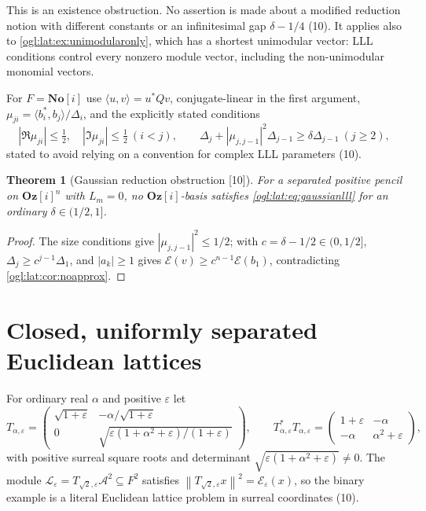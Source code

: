 \documentclass[11pt,oneside]{article}
\numberwithin{equation}{section}
\newtheorem{theorem}{Theorem}[section]
\theoremstyle{definition}
\theoremstyle{remark}
\newcommand{\No}{\mathbf{No}}
\newcommand{\GOz}{\mathbf{Oz}[i]}
\newcommand{\SC}{\No[i]}
\newcommand{\A}{\mathcal A}
\newcommand{\cE}{\mathcal E}
\newcommand{\norm}[1]{\left\lVert #1\right\rVert}
\newcommand{\src}[1]{\textup{\textsf{\small[#1]}}}
\begin{document}
This is an existence obstruction. No assertion is made about a modified
reduction notion with different constants or an infinitesimal gap
$\delta-1/4$ (10). It applies also to \cref{ogl:lat:ex:unimodularonly}, which has
a shortest unimodular vector: LLL conditions control every nonzero module vector,
including the non-unimodular monomial vectors.

For $F=\SC$ use $\langle u,v\rangle=u^*Qv$, conjugate-linear in the first
argument, $\mu_{ji}=\langle b_i^*,b_j\rangle/\Delta_i$, and the explicitly stated
conditions
\begin{equation}\label{ogl:lat:eq:gaussianlll}
 |\Re\mu_{ji}|\le\tfrac12,\quad|\Im\mu_{ji}|\le\tfrac12\ (i<j),\qquad
 \Delta_j+|\mu_{j,j-1}|^2\Delta_{j-1}\ge\delta\Delta_{j-1}\ (j\ge2),
\end{equation}
stated to avoid relying on a convention for complex LLL parameters (10).

\begin{theorem}[Gaussian reduction obstruction \src{10}]\label{ogl:lat:thm:gaussianlll}
For a separated positive pencil on $\GOz^n$ with $L_m=0$, no $\GOz$-basis
satisfies \eqref{ogl:lat:eq:gaussianlll} for an ordinary $\delta\in(1/2,1]$.
\end{theorem}
\begin{proof}
The size conditions give $|\mu_{j,j-1}|^2\le1/2$; with $c=\delta-1/2\in(0,1/2]$,
$\Delta_j\ge c^{j-1}\Delta_1$, and $|a_k|\ge1$ gives $\cE(v)\ge c^{n-1}\cE(b_1)$,
contradicting \cref{ogl:lat:cor:noapprox}.
\end{proof}

\section{Closed, uniformly separated Euclidean lattices}\label{ogl:lat:sec:euclidean}

For ordinary real $\alpha$ and positive $\varepsilon$ let
\[
 T_{\alpha,\varepsilon}=\begin{pmatrix}\sqrt{1+\varepsilon}&-\alpha/\sqrt{1+\varepsilon}\\
 0&\sqrt{\varepsilon(1+\alpha^2+\varepsilon)/(1+\varepsilon)}\end{pmatrix},
 \qquad
 T_{\alpha,\varepsilon}^*T_{\alpha,\varepsilon}
 =\begin{pmatrix}1+\varepsilon&-\alpha\\-\alpha&\alpha^2+\varepsilon\end{pmatrix},
\]
with positive surreal square roots and determinant
$\sqrt{\varepsilon(1+\alpha^2+\varepsilon)}\ne0$. The module
$\mathcal L_\varepsilon=T_{\sqrt2,\varepsilon}\A^2\subseteq F^2$ satisfies
$\norm{T_{\sqrt2,\varepsilon}x}^2=\cE_\varepsilon(x)$, so the binary example is a
literal Euclidean lattice problem in surreal coordinates (10).
\end{document}
